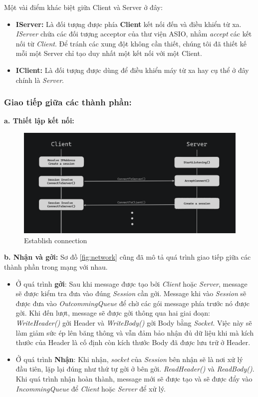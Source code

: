 Một vài điểm khác biệt giữa Client và Server ở đây: 
\begin{itemize}
	\item \textbf{IServer: } Là đối tượng được phía \textbf{Client} kết nối đến và điều khiển từ xa. \textit{IServer} chứa các đối tượng acceptor của thư viện ASIO, nhằm \textit{accept} các kết nối từ \textit{Client}. Để tránh các xung đột không cần thiết, chúng tôi đã thiết kế mỗi một Server chỉ tạo duy nhất một kết nối với một Client.
	\item \textbf{IClient: } Là đối tượng được dùng để điều khiển máy từ xa hay cụ thể ở đây chính là \textit{Server}. 
\end{itemize}

\subsubsection{Giao tiếp giữa các thành phần: }

\textbf{a. Thiết lập kết nối:}
\begin{figure}[H]
	\centering
	\includegraphics[width=\linewidth]{latex/architechture/connecting}
	\caption{Establish connection}
\end{figure}

\textbf{b. Nhận và gởi: }
Sơ đồ \ref{fig:network} cũng đã mô tả quá trình giao tiếp giữa các thành phần trong mạng với nhau. 
\begin{itemize}
	\item Ở quá trình \textbf{gởi}: Sau khi message được tạo bởi \textit{Client} hoặc \textit{Server}, message sẽ được kiểm tra đưa vào đúng \textit{Session} cần gởi. Message khi vào \textit{Session} sẽ được đưa vào \textit{OutcommingQueue} để chờ các gói message phía trước nó được gởi. Khi đến lượt, message sẽ được gởi thông qua hai giai đoạn: \textit{WriteHeader()} gởi Header và \textit{WriteBody()} gởi Body bằng \textit{Socket}. Việc này sẽ làm giảm sức ép lên băng thông và vẫn đảm bảo nhận đủ dữ liệu khi mà kích thước của Header là cố định còn kích thước Body đã được lưu trữ ở Header.
	\item Ở quá trình \textbf{Nhận}: Khi nhận, \textit{socket} của \textit{Session} bên nhận sẽ là nơi xử lý đầu tiên, lặp lại đúng như thứ tự gởi ở bên gởi. \textit{ReadHeader()} và \textit{ReadBody()}. Khi quá trình nhận hoàn thành, message mới sẽ được tạo và sẽ được đẩy vào \textit{IncommingQueue} để \textit{Client} hoặc \textit{Server} để xử lý.
\end{itemize}

